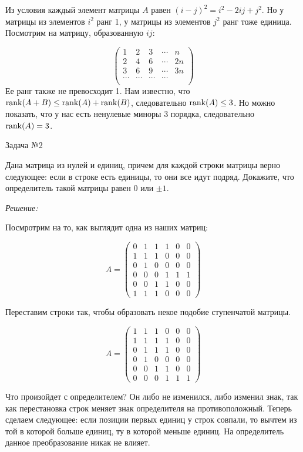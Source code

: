 \documentclass[10pt]{article}
\begin{document}
Из условия каждый элемент матрицы $A$ равен $(i-j)^2 = i^2 - 2ij + j^2$. Но у матрицы из элементов $i^2$ ранг 1, у матрицы из элементов $j^2$ ранг тоже единица. Посмотрим на матрицу, образованную $ij$:

\[
\begin{pmatrix}
1 & 2 & 3 & \cdots & n \\
2 & 4 & 6 & \cdots & 2n \\
3 & 6 & 9 & \cdots & 3n \\
\cdots & \cdots & \cdots & \cdots \\
\end{pmatrix}
\]
Ее ранг также не превосходит 1. Нам известно, что $\operatorname{rank}(A + B) \leq \operatorname{rank}(A) + \operatorname{rank}(B)$, следовательно $\operatorname{rank}(A) \leq 3$. Но можно показать, что у нас есть ненулевые миноры 3 порядка, следовательно $\operatorname{rank}(A) = 3$.

\hspace{2mm}

Задача №2

Дана матрица из нулей и единиц, причем для каждой строки матрицы верно следующее: если в строке есть единицы, то они все идут подряд. Докажите, что определитель такой матрицы равен 0 или $\pm 1$.

\textit{Решение:}

Посмротрим на то, как выглядит одна из наших матриц:

\[
A = \begin{pmatrix}
0 & 1 & 1 & 1 & 0 & 0 \\
1 & 1 & 1 & 0 & 0 & 0 \\
0 & 1 & 0 & 0 & 0 & 0 \\
0 & 0 & 0 & 1 & 1 & 1 \\
0 & 0 & 1 & 1 & 0 & 0 \\
1 & 1 & 1 & 0 & 0 & 0
\end{pmatrix}
\]

Переставим строки так, чтобы образовать некое подобие ступенчатой матрицы.

\[
A = \begin{pmatrix}
1 & 1 & 1 & 0 & 0 & 0 \\
1 & 1 & 1 & 1 & 0 & 0 \\
0 & 1 & 1 & 1 & 0 & 0 \\
0 & 1 & 0 & 0 & 0 & 0 \\
0 & 0 & 1 & 1 & 0 & 0 \\
0 & 0 & 0 & 1 & 1 & 1
\end{pmatrix}
\]

Что произойдет с определителем? Он либо не изменился, либо изменил знак, так как перестановка строк меняет знак определителя на противоположный. Теперь сделаем следующее: если позиции первых единиц у строк совпали, то вычтем из той в которой больше единиц, ту в которой меньше единиц. На определитель данное преобразование никак не влияет.
\end{document}
